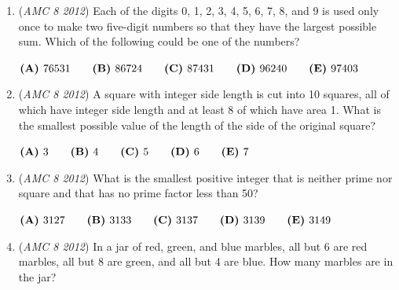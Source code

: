 \begin{enumerate}
 $\textbf{(A)}\hspace{.05in}40\text{ and }50\qquad\textbf{(B)}\hspace{.05in}51\text{ and }55\qquad\textbf{(C)}\hspace{.05in}56\text{ and }60\qquad\textbf{(D)}\hspace{.05in}\text{61 and 65}\qquad\textbf{(E)}\hspace{.01in}\text{66 and 99}$


	\item (\textit{AMC 8 2012}) Each of the digits 0, 1, 2, 3, 4, 5, 6, 7, 8, and 9 is used only once to make two five-digit numbers so that they have the largest possible sum. Which of the following could be one of the numbers?


 $\textbf{(A)}\hspace{.05in}76531\qquad\textbf{(B)}\hspace{.05in}86724\qquad\textbf{(C)}\hspace{.05in}87431\qquad\textbf{(D)}\hspace{.05in}96240\qquad\textbf{(E)}\hspace{.05in}97403$


	\item (\textit{AMC 8 2012}) A square with integer side length is cut into 10 squares, all of which have integer side length and at least 8 of which have area 1. What is the smallest possible value of the length of the side of the original square?


 $\textbf{(A)}\hspace{.05in}3\qquad\textbf{(B)}\hspace{.05in}4\qquad\textbf{(C)}\hspace{.05in}5\qquad\textbf{(D)}\hspace{.05in}6\qquad\textbf{(E)}\hspace{.05in}7$


	\item (\textit{AMC 8 2012}) What is the smallest positive integer that is neither prime nor square and that has no prime factor less than 50?


 $\textbf{(A)}\hspace{.05in}3127\qquad\textbf{(B)}\hspace{.05in}3133\qquad\textbf{(C)}\hspace{.05in}3137\qquad\textbf{(D)}\hspace{.05in}3139\qquad\textbf{(E)}\hspace{.05in}3149$


	\item (\textit{AMC 8 2012}) In a jar of red, green, and blue marbles, all but 6 are red marbles, all but 8 are green, and all but 4 are blue. How many marbles are in the jar?



\end{enumerate}
